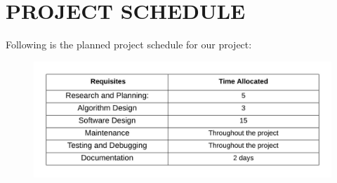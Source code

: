 
\section{PROJECT SCHEDULE}
Following is the planned project schedule for our project:
\begin{figure}[h]
	\centering
	\includegraphics{sec/pdf/schedule1}
\end{figure}

